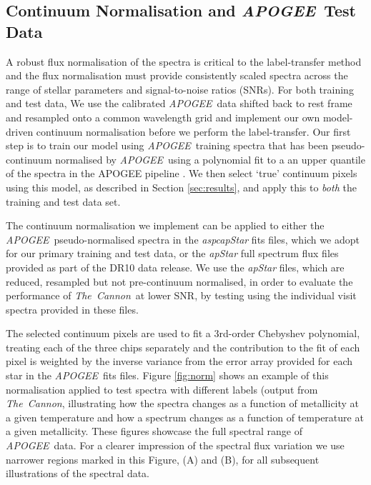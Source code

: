 \documentclass[12pt, preprint]{aastex}
\newcommand{\tc}{\textsl{The~Cannon}}
\newcommand{\apogee}{\textsl{APOGEE}}
\begin{document}
\subsection{Continuum Normalisation and \apogee\ Test Data}

A robust flux normalisation of the spectra is critical to the label-transfer method and the flux normalisation must provide consistently scaled spectra across the range of stellar parameters and signal-to-noise ratios (SNRs). For both training and test data, We use the calibrated \apogee\ data shifted back to rest frame and resampled onto a common wavelength grid and implement our own model-driven continuum normalisation before we perform the label-transfer. Our first step is to train our model using \apogee\ training spectra that has been pseudo-continuum normalised by \apogee\ using a polynomial fit to a an upper quantile of the spectra in the APOGEE pipeline \citep{Meszaros2013}. 
We then select  `true' continuum pixels using this model, as described in Section \ref{sec:results}, and apply this to \textit{both} the training and test data set. 

The continuum normalisation we implement can be applied to either the \apogee\ pseudo-normalised spectra in the \textit{aspcapStar} fits files, which we adopt for our primary training and test data, or the \textit{apStar} full spectrum flux files provided as part of the DR10 data release. We use the \textit{apStar} files, which are reduced, resampled but not pre-continuum normalised, in order to evaluate the performance of \tc\ at lower SNR, by testing using the individual visit spectra provided in these files.  

The selected continuum pixels are used to fit a 3rd-order Chebyshev polynomial, treating each of the three chips separately and the contribution to the fit of each pixel is weighted by the inverse variance from the error array provided for each star in the \apogee\ fits files. Figure \ref{fig:norm} shows an example of this normalisation applied to test spectra with different labels (output from \tc\), illustrating how the spectra changes as a function of metallicity at a given temperature and how a spectrum changes as a function of temperature at a given metallicity. These figures showcase the full spectral range of \apogee\ data. For a clearer impression of the spectral flux variation we use narrower regions marked in this Figure, (A) and (B), for all subsequent illustrations of the spectral data. 

\end{document}
